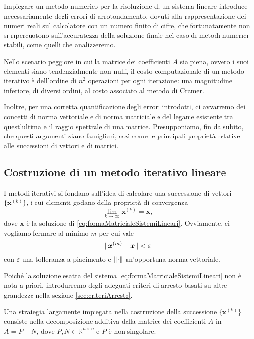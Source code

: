 Impiegare un metodo numerico per la risoluzione di un sistema lineare introduce necessariamente degli errori di arrotondamento, dovuti alla rappresentazione
dei numeri reali sul calcolatore con un numero finito di cifre, che fortunatamente non si ripercuotono sull'accuratezza della soluzione finale nel caso di
metodi numerici stabili, come quelli che analizzeremo.

Nello scenario peggiore in cui la matrice dei coefficienti $A$ sia piena, ovvero i suoi elementi siano tendenzialmente non nulli,
il costo computazionale di un metodo iterativo \`e dell'ordine di $n^{2}$ operazioni per ogni iterazione: una magnitudine inferiore, di diversi ordini,
al costo associato al metodo di Cramer.

Inoltre, per una corretta quantificazione degli errori introdotti, ci avvarremo dei concetti di norma vettoriale e di norma
matriciale e del legame esistente tra quest'ultima e il raggio spettrale di una matrice.\newline
Presupponiamo, fin da subito, che questi argomenti siano famigliari, cos\`i come le principali propriet\`a relative alle successioni di vettori e di matrici.
\subsection{Costruzione di un metodo iterativo lineare}
I metodi iterativi si fondano sull'idea di calcolare una successione di vettori $\{\bm{x}^{(k)}\}$, i cui elementi godano della propriet\`a di convergenza
\begin{equation}
    \label{eq:proprietaConvergenza}
    \lim_{k \to \infty} \bm{x}^{(k)}=\bm{x},
\end{equation}
dove $\bm{x}$ \`e la soluzione di \eqref{eq:formaMatricialeSistemiLineari}. \newline
Ovviamente, ci vogliamo fermare al minimo $m$ per cui vale
\begin{equation*}
    \lVert\bm{x}^{(m)}- \bm{x}\rVert < \varepsilon
\end{equation*}
con $\varepsilon$ una tolleranza a piacimento e $\lVert\cdot\rVert$ un'opportuna norma vettoriale.

Poich\'e la soluzione esatta del sistema \eqref{eq:formaMatricialeSistemiLineari} non \`e nota a priori, introdurremo degli adeguati criteri di arresto basati
su altre grandezze nella sezione \ref{sec:criteriArresto}.

Una strategia largamente impiegata nella costruzione della successione $\{\bm{x}^{(k)}\}$ consiste nella decomposizione additiva della matrice dei
coefficienti $A$ in $A=P-N$, dove $P, N\in\mathbb{R}^{n \times n}$ e $P$ \`e non singolare.

